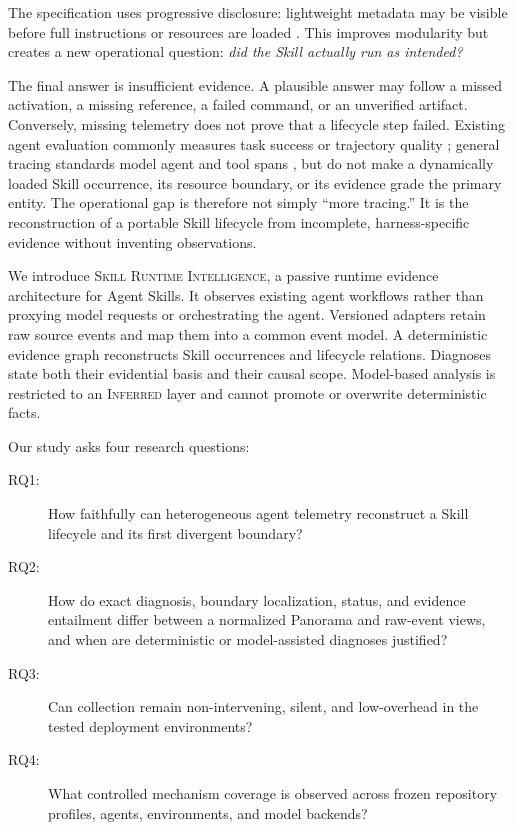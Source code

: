 \documentclass[runningheads]{llncs}
\newcommand{\system}{\textsc{Skill Runtime Intelligence}\xspace}
\newcommand{\inferred}{\textsc{Inferred}\xspace}
\begin{document}
The specification uses progressive disclosure: lightweight metadata may
be visible before full instructions or resources are loaded
\cite{agent-skills-spec}.  This improves modularity but creates a new operational
question: \emph{did the Skill actually run as intended?}

The final answer is insufficient evidence.  A plausible answer may follow a
missed activation, a missing reference, a failed command, or an unverified
artifact.  Conversely, missing telemetry does not prove that a lifecycle step
failed.  Existing agent evaluation commonly measures task success or trajectory
quality \cite{swebench,agentdiagnose}; general tracing standards model
agent and tool spans \cite{otel-genai}, but do not make a dynamically loaded
Skill occurrence, its resource boundary, or its evidence grade the primary
entity.  The operational gap is therefore not simply ``more tracing.''  It is
the reconstruction of a portable Skill lifecycle from incomplete,
harness-specific evidence without inventing observations.

We introduce \system, a passive runtime evidence architecture for Agent Skills.
It observes existing agent workflows rather than proxying model requests or
orchestrating the agent.  Versioned adapters retain raw source events and map
them into a common event model.  A deterministic evidence graph reconstructs
Skill occurrences and lifecycle relations.  Diagnoses state both their
evidential basis and their causal scope.  Model-based analysis is restricted to
an \inferred layer and cannot promote or overwrite deterministic facts.

Our study asks four research questions:

\begin{description}
  \item[RQ1:] How faithfully can heterogeneous agent telemetry reconstruct a
  Skill lifecycle and its first divergent boundary?
  \item[RQ2:] How do exact diagnosis, boundary localization, status, and
  evidence entailment differ between a normalized Panorama and raw-event views,
  and when are deterministic or model-assisted diagnoses justified?
  \item[RQ3:] Can collection remain non-intervening, silent, and low-overhead
  in the tested deployment environments?
  \item[RQ4:] What controlled mechanism coverage is observed across frozen
  repository profiles, agents, environments, and model backends?
\end{description}
\end{document}
